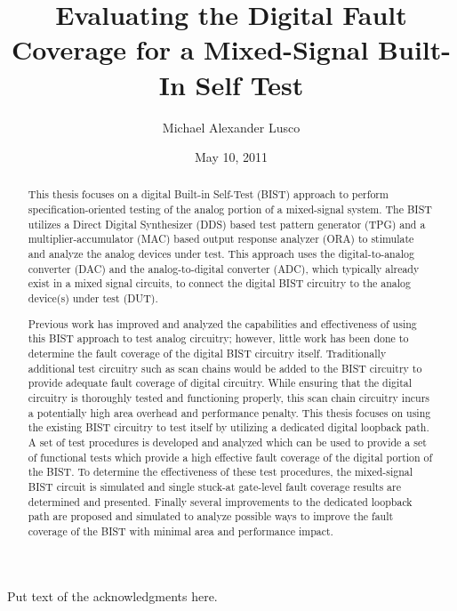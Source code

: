\documentclass[12pt]{report}
\title{Evaluating the Digital Fault Coverage for a Mixed-Signal Built-In Self Test}
\author{Michael Alexander Lusco}
\date{May 10, 2011} %
\begin{document}
\begin{romanpages}      %

\TitlePage 

\begin{abstract}
This thesis focuses on a digital Built-in Self-Test (BIST) approach to perform specification-oriented testing of the analog portion of a mixed-signal system.  The BIST utilizes a Direct Digital Synthesizer (DDS) based test pattern generator (TPG) and a multiplier-accumulator (MAC) based output response analyzer (ORA) to stimulate and analyze the analog devices under test.  This approach uses the digital-to-analog converter (DAC) and the analog-to-digital converter (ADC), which typically already exist in a mixed signal circuits, to connect the digital BIST circuitry to the analog device(s) under test (DUT).

Previous work has improved and analyzed the capabilities and effectiveness of using this BIST approach to test analog circuitry; however, little work has been done to determine the fault coverage of the digital BIST circuitry itself.  Traditionally additional test circuitry such as scan chains would be added to the BIST circuitry to provide adequate fault coverage of digital circuitry.  While ensuring that the digital circuitry is thoroughly tested and functioning properly, this scan chain circuitry incurs a potentially high area overhead and performance penalty.  This thesis focuses on using the existing BIST circuitry to test itself by utilizing a dedicated digital loopback path.  A set of test procedures is developed and analyzed which can be used to provide a set of functional tests which provide a high effective fault coverage of the digital portion of the BIST.  To determine the effectiveness of these test procedures, the mixed-signal BIST circuit is simulated and single stuck-at gate-level fault coverage results are determined and presented.  Finally several improvements to the dedicated loopback path are proposed and simulated to analyze possible ways to improve the fault coverage of the BIST with minimal area and performance impact.
\end{abstract}

\begin{acknowledgments}
Put text of the acknowledgments here.
\end{acknowledgments}

\tableofcontents
\listoffigures
\listoftables

\printnomenclature[0.5in] %
\end{romanpages}        %
\end{document}
